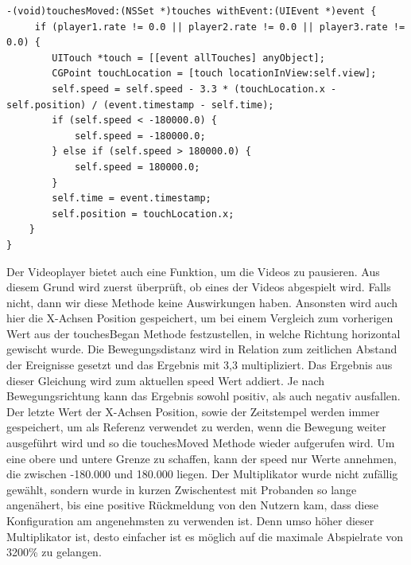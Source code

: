\documentclass[11pt,a4paper]{report}
\begin{document}
\begin{lstlisting}
-(void)touchesMoved:(NSSet *)touches withEvent:(UIEvent *)event {
	 if (player1.rate != 0.0 || player2.rate != 0.0 || player3.rate != 0.0) {
	 	UITouch *touch = [[event allTouches] anyObject];
	 	CGPoint touchLocation = [touch locationInView:self.view];
	 	self.speed = self.speed - 3.3 * (touchLocation.x - self.position) / (event.timestamp - self.time);
	 	if (self.speed < -180000.0) {
		 	self.speed = -180000.0;
	 	} else if (self.speed > 180000.0) {
	 		self.speed = 180000.0;
	 	}
	 	self.time = event.timestamp;
	 	self.position = touchLocation.x;
    }
}
\end{lstlisting}
Der Videoplayer bietet auch eine Funktion, um die Videos zu pausieren. Aus diesem Grund wird zuerst überprüft, ob eines der Videos abgespielt wird. Falls nicht, dann wir diese Methode keine Auswirkungen haben. Ansonsten wird auch hier die X-Achsen Position gespeichert, um bei einem Vergleich zum vorherigen Wert aus der touchesBegan Methode festzustellen, in welche Richtung horizontal gewischt wurde. Die Bewegungsdistanz wird in Relation zum zeitlichen Abstand der Ereignisse gesetzt und das Ergebnis mit 3,3 multipliziert. Das Ergebnis aus dieser Gleichung wird zum aktuellen speed Wert addiert. Je nach Bewegungsrichtung kann das Ergebnis sowohl positiv, als auch negativ ausfallen. Der letzte Wert der X-Achsen Position, sowie der Zeitstempel werden immer gespeichert, um als Referenz verwendet zu werden, wenn die Bewegung weiter ausgeführt wird und so die touchesMoved Methode wieder aufgerufen wird. Um eine obere und untere Grenze zu schaffen, kann der speed nur Werte annehmen, die zwischen -180.000 und 180.000 liegen. Der Multiplikator wurde nicht zufällig gewählt, sondern wurde in kurzen Zwischentest mit Probanden so lange angenähert, bis eine positive Rückmeldung von den Nutzern kam, dass diese Konfiguration am angenehmsten zu verwenden ist. Denn umso höher dieser Multiplikator ist, desto einfacher ist es möglich auf die maximale Abspielrate von 3200\% zu gelangen.
\end{document}
